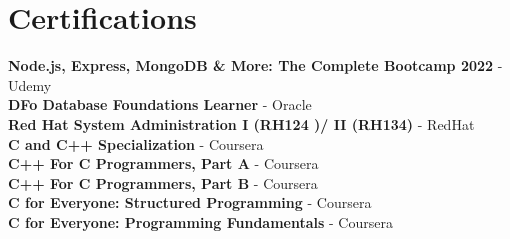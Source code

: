 \documentclass[a4paper,11pt]{article}
\begin{document}
\section{Certifications}
\begin{itemize}[leftmargin=0.15in, label={}]
	\small{
		\item{
		            \textbf{Node.js, Express, MongoDB \& More: The Complete Bootcamp 2022}{ - Udemy} \\
		            \textbf{DFo Database Foundations Learner}{ - Oracle} \\
		            \textbf{Red Hat System Administration I (RH124 )/ II (RH134)}{ - RedHat} \\
		            \textbf{C and C++ Specialization}{ - Coursera}\\
		            \textbf{C++ For C Programmers, Part A}{ - Coursera} \\
		            \textbf{C++ For C Programmers, Part B}{ - Coursera}\\
		            \textbf{C for Everyone: Structured Programming}{ - Coursera} \\
		            \textbf{C for Everyone: Programming Fundamentals}{ - Coursera}
		      }
	}
\end{itemize}

\end{document}
